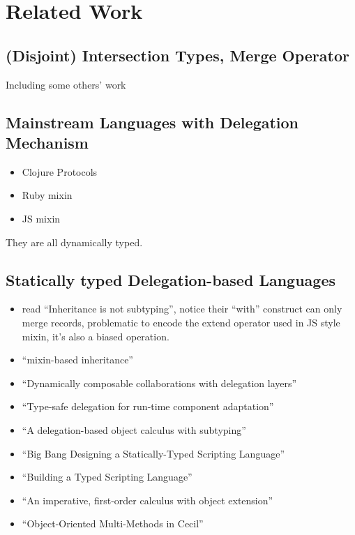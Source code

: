 \section{Related Work}

\subsection{(Disjoint) Intersection Types, Merge Operator}

Including some others' work


\subsection{Mainstream Languages with Delegation Mechanism}

\begin{itemize}
\item Clojure Protocols
\item Ruby mixin
\item JS mixin
\end{itemize}

They are all dynamically typed.

\subsection{Statically typed Delegation-based Languages}

\begin{itemize}
\item read ``Inheritance is not subtyping'', notice their ``with'' construct can
  only merge records, problematic to encode the extend operator used in JS style
  mixin, it's also a biased operation.

\item ``mixin-based inheritance''

\item ``Dynamically composable collaborations with delegation layers''

\item ``Type-safe delegation for run-time component adaptation''

\item ``A delegation-based object calculus with subtyping''

\item ``Big Bang Designing a Statically-Typed Scripting Language''

\item ``Building a Typed Scripting Language''

\item ``An imperative, first-order calculus with object extension''

\item ``Object-Oriented Multi-Methods in Cecil''

\end{itemize}

